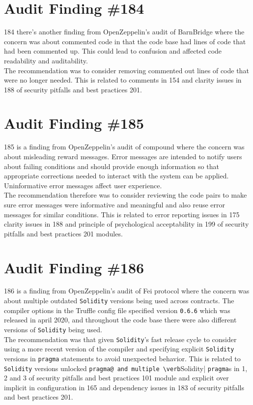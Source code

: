 \section{Audit Finding \#184}

184 there's another finding from OpenZeppelin's audit of BarnBridge where the concern was about commented code in that the code base had lines of code that had been commented up. This could lead to confusion and affected code readability and auditability.\\

The recommendation was to consider removing commented out lines of code that were no longer needed. This is related to comments in 154 and clarity issues in 188 of security pitfalls and best practices 201.

\section{Audit Finding \#185}

185 is a finding from OpenZeppelin's audit of compound where the concern was about misleading reward messages. Error messages are intended to notify users about failing conditions and should provide enough information so that appropriate corrections needed to interact with the system can be applied. Uninformative error messages affect user experience.\\

The recommendation therefore was to consider reviewing the code pairs to make sure error messages were informative and meaningful and also reuse error messages for similar conditions. This is related to error reporting issues in 175 clarity issues in 188 and principle of psychological acceptability in 199 of security pitfalls and best practices 201 modules.

\section{Audit Finding \#186}

186 is a finding from OpenZeppelin's audit of Fei protocol where the concern was about multiple outdated \verb|Solidity| versions being used across contracts. The compiler options in the Truffle config file specified version \verb|0.6.6| which was released in april 2020, and throughout the code base there were also different versions of \verb|Solidity| being used.\\

The recommendation was that given \verb|Solidity|'s fast release cycle to consider using a more recent version of the compiler and specifying explicit \verb|Solidity| versions in \verb|pragma| statements to avoid unexpected behavior. This is related to \verb|Solidity| versions unlocked \verb|pragma@ and multiple \verb|Solidity| \verb|pragma|s in 1, 2 and 3 of security pitfalls and best practices 101 module and explicit over implicit in configuration in 165 and dependency issues in 183 of security pitfalls and best practices 201.

